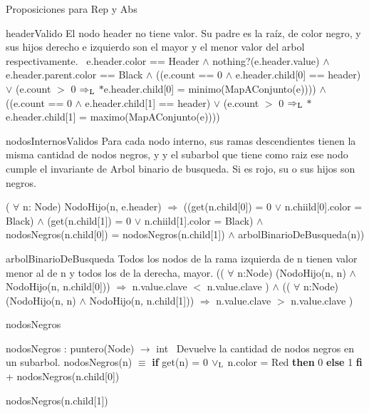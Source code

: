 Proposiciones para Rep y Abs

\begin{DoxyParagraph}{header\+Valido}
El nodo header no tiene valor. Su padre es la raíz, de color negro, y sus hijos derecho e izquierdo son el mayor y el menor valor del arbol respectivamente.~\newline
 e.\+header.\+color == Header $\land$ nothing?(e.\+header.\+value) $\land$ e.\+header.\+parent.\+color == Black $\land$ ((e.\+count == 0 $\land$ e.\+header.\+child\mbox{[}0\mbox{]} == header) $\lor$ (e.\+count $>$ 0 $\Rightarrow_{\rm L}$ $\ast$e.header.\+child\mbox{[}0\mbox{]} = minimo(\+Map\+A\+Conjunto(e)))) $\land$ ((e.\+count == 0 $\land$ e.\+header.\+child\mbox{[}1\mbox{]} == header) $\lor$ (e.\+count $>$ 0 $\Rightarrow_{\rm L}$ $\ast$e.header.\+child\mbox{[}1\mbox{]} = maximo(\+Map\+A\+Conjunto(e)))) 
\end{DoxyParagraph}


\begin{DoxyParagraph}{nodos\+Internos\+Validos}
Para cada nodo interno, sus ramas descendientes tienen la misma cantidad de nodos negros, y y el subarbol que tiene como raiz ese nodo cumple el invariante de Arbol binario de busqueda. Si es rojo, su o sus hijos son negros.

( $\forall$ n\+: Node) Nodo\+Hijo(n, e.\+header) $\Rightarrow$ ((get(n.\+child\mbox{[}0\mbox{]}) = 0 $\lor$ n.\+chiild\mbox{[}0\mbox{]}.color = Black) $\land$ (get(n.\+child\mbox{[}1\mbox{]}) = 0 $\lor$ n.\+chiild\mbox{[}1\mbox{]}.color = Black) $\land$ nodos\+Negros(n.\+child\mbox{[}0\mbox{]}) = nodos\+Negros(n.\+child\mbox{[}1\mbox{]}) $\land$ arbol\+Binario\+De\+Busqueda(n)) 
\end{DoxyParagraph}


\begin{DoxyParagraph}{arbol\+Binario\+De\+Busqueda}
Todos los nodos de la rama izquierda de n tienen valor menor al de n y todos los de la derecha, mayor. (( $\forall$ n\textquotesingle{}\+:Node) (Nodo\+Hijo(n\textquotesingle{}, n) $\land$ Nodo\+Hijo(n\textquotesingle{}, n.\+child\mbox{[}0\mbox{]})) $\Rightarrow$ n\textquotesingle{}.value.\+clave $<$ n.\+value.\+clave ) $\land$ (( $\forall$ n\textquotesingle{}\+:Node) (Nodo\+Hijo(n\textquotesingle{}, n) $\land$ Nodo\+Hijo(n\textquotesingle{}, n.\+child\mbox{[}1\mbox{]})) $\Rightarrow$ n\textquotesingle{}.value.\+clave $>$ n.\+value.\+clave ) 
\end{DoxyParagraph}


\begin{DoxyParagraph}{nodos\+Negros}


nodos\+Negros \+: puntero(\+Node) $\to$ int~\newline
Devuelve la cantidad de nodos negros en un subarbol. nodos\+Negros(n) $\equiv$ {\bfseries if} get(n) = 0 $\lor_{\rm L}$ n.\+color = Red {\bfseries then} 0 {\bfseries else} 1 {\bfseries fi} + nodos\+Negros(n.\+child\mbox{[}0\mbox{]})
\begin{DoxyItemize}
\item nodos\+Negros(n.\+child\mbox{[}1\mbox{]}) 
\end{DoxyItemize}
\end{DoxyParagraph}



